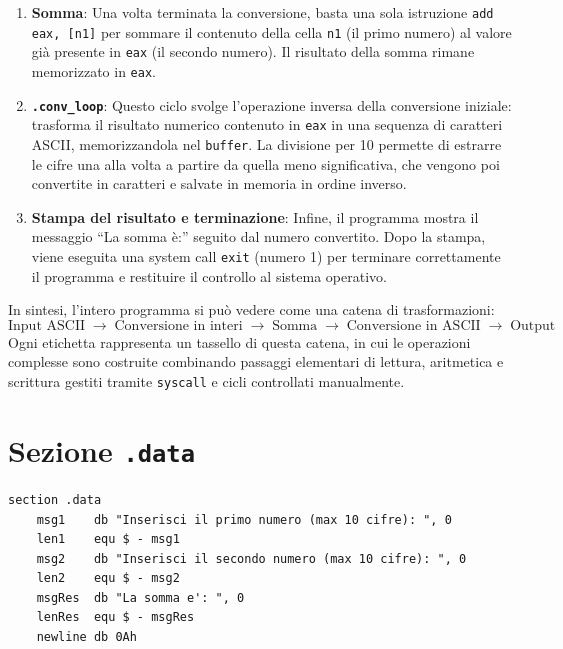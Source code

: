 \documentclass[a4paper,12pt]{article}
\begin{document}
\begin{enumerate}
		\item \textbf{Somma}:  
		Una volta terminata la conversione, basta una sola istruzione \texttt{add eax, [n1]} per sommare il contenuto della cella \texttt{n1} (il primo numero) al valore già presente in \texttt{eax} (il secondo numero).  
		Il risultato della somma rimane memorizzato in \texttt{eax}.  
		
		\item \textbf{\texttt{.conv\_loop}}:  
		Questo ciclo svolge l’operazione inversa della conversione iniziale: trasforma il risultato numerico contenuto in \texttt{eax} in una sequenza di caratteri ASCII, memorizzandola nel \texttt{buffer}.  
		La divisione per 10 permette di estrarre le cifre una alla volta a partire da quella meno significativa, che vengono poi convertite in caratteri e salvate in memoria in ordine inverso.  
		
		\item \textbf{Stampa del risultato e terminazione}:  
		Infine, il programma mostra il messaggio “La somma è:” seguito dal numero convertito.  
		Dopo la stampa, viene eseguita una system call \texttt{exit} (numero 1) per terminare correttamente il programma e restituire il controllo al sistema operativo.
	\end{enumerate}
	
	\bigskip
	
	\noindent
	In sintesi, l’intero programma si può vedere come una catena di trasformazioni:  
	\[
	\text{Input ASCII} \;\rightarrow\; \text{Conversione in interi} \;\rightarrow\; \text{Somma} \;\rightarrow\; \text{Conversione in ASCII} \;\rightarrow\; \text{Output}
	\]
	Ogni etichetta rappresenta un tassello di questa catena, in cui le operazioni complesse sono costruite combinando passaggi elementari di lettura, aritmetica e scrittura gestiti tramite \texttt{syscall} e cicli controllati manualmente.
	
	
	\newpage
	
	\section*{Sezione \texttt{.data}}
	\begin{lstlisting}[language={[x86masm]Assembler}]
section .data
	msg1    db "Inserisci il primo numero (max 10 cifre): ", 0
	len1    equ $ - msg1
	msg2    db "Inserisci il secondo numero (max 10 cifre): ", 0
	len2    equ $ - msg2
	msgRes  db "La somma e': ", 0
	lenRes  equ $ - msgRes
	newline db 0Ah 
	\end{lstlisting}
	
\end{document}
